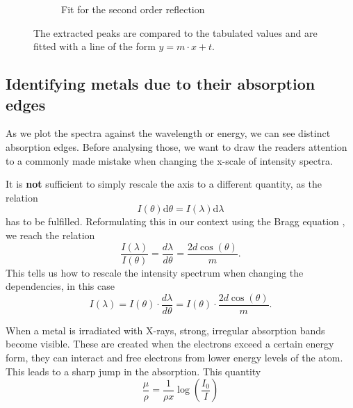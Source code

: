 \begin{figure}[h]
\begin{subfigure}[b]{0.4\textwidth}
      \caption{Fit for the second order reflection}
      \label{fig:subfig2}
    \end{subfigure}
    \caption{The extracted peaks are compared to the tabulated values and are fitted with a line of the form $y = m\cdot x + t$.}
    \label{fig:mainfig}
\end{figure}

\subsection{Identifying metals due to their absorption edges}

As we plot the spectra against the wavelength or energy, we can see distinct absorption edges. Before analysing those, 
we want to draw the readers attention to a commonly made mistake when changing the x-scale of intensity spectra.

It is \textbf{not} sufficient to simply rescale the axis to a different quantity, as the relation
\begin{equation*}
    I(\theta) \mathrm{d}\theta = I(\lambda) \mathrm{d}\lambda
\end{equation*}
has to be fulfilled. Reformulating this in our context using the Bragg equation , we reach the relation 
\begin{equation}
    \frac{I(\lambda)}{I(\theta)} = \frac{d \lambda}{d \theta} = \frac{2 d \cos(\theta)}{m}.
\end{equation}
This tells us how to rescale the intensity spectrum when changing the dependencies, in this case 
\begin{equation}
    I(\lambda) = I(\theta) \cdot  \frac{d \lambda}{d \theta} = I(\theta) \cdot \frac{2 d \cos(\theta)}{m} .
\end{equation}

When a metal is irradiated with X-rays, strong, irregular absorption bands become visible. These are created when the electrons exceed a certain energy form, they can interact and
free electrons from lower energy levels of the atom.  This leads to a sharp jump in the absorption.
This quantity
\begin{equation}
    \frac{\mu}{\rho} = \frac{1}{\rho x}\log(\frac{I_0}{I})
\end{equation}


